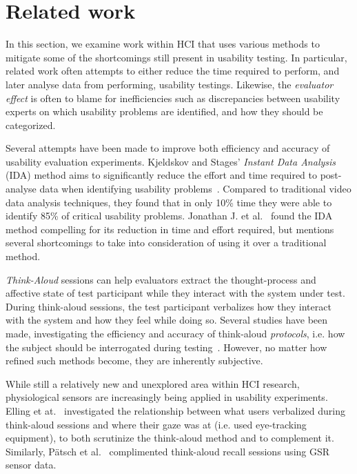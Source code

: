 \section{Related work}
In this section, we examine work within HCI that uses various methods to mitigate some of the shortcomings still present
in usability testing. In particular, related work often attempts to either reduce the time required to perform, and
later analyse data from performing, usability testings. Likewise, the \textit{evaluator effect} is often to blame for
inefficiencies such as discrepancies between usability experts on which usability problems are identified, and how they
should be categorized.

Several attempts have been made to improve both efficiency and accuracy of
usability evaluation experiments. Kjeldskov and Stages' \textit{Instant Data
Analysis} (IDA) method aims to significantly reduce the effort and time required
to post-analyse data when identifying usability
problems~\cite{instant_data_analysis}. Compared to traditional video data
analysis techniques, they found that in only 10\% time they were able to
identify 85\% of critical usability problems. Jonathan J. et
al.~\cite{use_of_TA_and_IDA} found the IDA
method compelling for its reduction in time and effort required, but mentions
several shortcomings to take into consideration of using it over a traditional
method.

\textit{Think-Aloud} sessions can help evaluators extract the thought-process
and affective state of test participant while they interact with the system
under test. During think-aloud sessions, the test participant verbalizes how
they interact with the system and how they feel while doing so.  Several studies
have been made, investigating the efficiency and accuracy of think-aloud
\textit{protocols}, i.e. how the subject should be interrogated during
testing~\cite{two_think_aloud_protocols_study}. However, no matter how refined
such methods become, they are inherently subjective.

While still a relatively new and unexplored area within HCI research,
physiological sensors are increasingly being applied in usability experiments.
Elling et at.~\cite{concurrent_think_aloud_eye_tracking} investigated the
relationship between what users verbalized during think-aloud sessions and where
their gaze was at (i.e. used eye-tracking equipment), to both scrutinize the
think-aloud method and to complement it. Similarly, P\"{a}tsch et
al.~\cite{using_sensor_graphs_think_aloud} complimented think-aloud recall
sessions using GSR sensor data.

